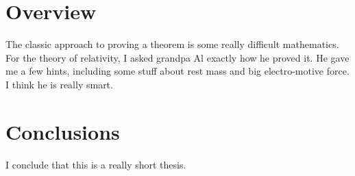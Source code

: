 \section{\label{section:overview}Overview}
   The classic approach to proving a theorem is some really difficult 
   mathematics.  For the theory of relativity, I asked grandpa Al exactly 
   how he proved it.  He gave me a few hints, including some stuff about
   rest mass and big electro-motive force.  I think he is really smart.
\section{Conclusions}
   I conclude that this is a really short thesis.